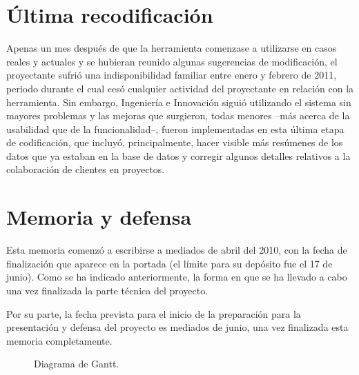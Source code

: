 \section{Última recodificación}

Apenas un mes después de que la herramienta comenzase a utilizarse en casos
reales y actuales y se hubieran reunido algunas sugerencias de modificación,
el proyectante sufrió una indisponibilidad familiar entre enero y febrero de
2011, periodo durante el cual cesó cualquier actividad del proyectante en
relación con la herramienta. Sin embargo, Ingeniería e Innovación siguió
utilizando el sistema sin mayores problemas y las mejoras que surgieron, todas
menores --más acerca de la usabilidad que de la funcionalidad--, fueron
implementadas en esta última etapa de codificación, que incluyó,
principalmente, hacer visible más resúmenes de los datos que ya estaban en la
base de datos y corregir algunos detalles relativos a la colaboración de
clientes en proyectos.

\section{Memoria y defensa}

Esta memoria comenzó a escribirse a mediados de abril del 2010, con la fecha de
finalización que aparece en la portada (el límite para su depósito fue el 17 de
junio). Como se ha indicado anteriormente, la forma en que se ha llevado a cabo
una vez finalizada la parte técnica del proyecto.

Por su parte, la fecha prevista para el inicio de la preparación para la
presentación y defensa del proyecto es mediados de junio, una vez finalizada
esta memoria completamente.

\begin{figure}[h]
\centering
{}
\caption{Diagrama de Gantt.}
\label{fig:gantt}
\end{figure}

% 
% 


 